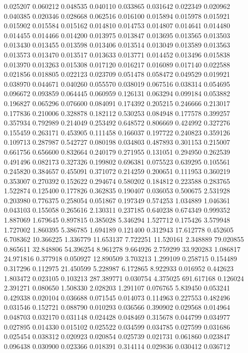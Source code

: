 0.025207
0.060212
0.048535
0.040110
0.033865
0.031642
0.022349
0.020962
0.040385
0.020346
0.028668
0.062516
0.016100
0.015894
0.015978
0.015921
0.015902
0.015584
0.015162
0.014810
0.014753
0.014807
0.014641
0.014480
0.014455
0.014466
0.014200
0.013975
0.013847
0.013695
0.013565
0.013503
0.013430
0.013455
0.013598
0.013406
0.013514
0.013049
0.013589
0.013563
0.013573
0.013470
0.013517
0.013633
0.013771
0.014452
0.013496
0.015838
0.013970
0.013263
0.015308
0.017120
0.016217
0.016089
0.017140
0.022588
0.021856
0.018805
0.022123
0.023709
0.051478
0.058472
0.049529
0.019921
0.038970
0.044671
0.040260
0.055570
0.038019
0.067516
0.038314
0.054695
0.096672
0.093859
0.064445
0.060959
0.126131
0.063294
0.099184
0.053882
0.196827
0.065296
0.076600
0.084091
0.174392
0.205215
0.246666
0.213017
0.177836
0.210006
0.328878
0.182112
0.530253
0.084948
0.177578
0.399257
0.357934
0.792989
0.214049
0.253492
0.648572
0.806669
0.424992
0.327276
0.155459
0.263171
0.453905
0.111458
0.166037
0.197722
0.240823
0.359126
0.109713
0.287987
0.542727
0.080198
0.034803
0.487893
0.301153
0.215007
0.661756
0.656600
0.832664
0.240179
0.271955
0.131051
0.294950
0.262539
0.491496
0.082173
0.327326
0.199802
0.696381
0.075523
0.639295
0.105561
0.245820
0.384657
0.455091
0.371072
0.214259
0.200651
0.111953
0.360219
0.353007
0.270392
0.152622
0.294674
0.580202
0.184812
0.223588
0.283765
1.522874
0.125400
0.177826
0.362835
0.190407
0.036053
0.500675
2.531928
0.203980
0.776375
0.258054
0.051867
0.197349
0.574253
1.034889
1.046361
0.043103
0.155058
0.265616
2.130311
0.237185
0.640238
0.674349
0.999352
1.887069
1.679645
0.897815
0.385028
5.346294
1.527712
0.175426
3.579948
1.727002
1.860395
5.386785
1.694189
0.121400
0.312943
17.612778
0.452605
6.708362
10.366225
1.336779
11.653137
7.722251
11.520161
2.348889
79.020855
0.865611
32.848806
54.396254
8.961278
9.664926
2.759299
33.920283
1.086817
24.971816
0.377918
0.050927
12.890509
3.703213
1.299109
0.258715
0.154489
0.317296
0.112975
21.450599
5.228987
6.172865
8.922933
0.016952
0.442623
1.803472
0.023105
0.103213
287.389771
0.030754
4.375025
691.617168
0.126024
2.391271
0.080650
1.508330
2.028203
1.291107
0.076765
5.839450
0.053241
0.429338
0.020104
0.036688
0.071545
0.014073
0.114963
0.227553
0.482496
0.031546
0.152721
0.088790
0.010293
0.036566
0.390902
0.029568
0.014964
0.048703
0.032170
0.031148
0.024428
0.048469
0.315678
0.044799
0.034977
0.027895
0.014330
0.015102
0.025522
0.034599
0.034785
0.027599
0.031686
0.025454
0.038312
0.020923
0.020854
0.025739
0.021731
0.061860
0.023847
0.096438
0.030900
0.023366
0.018391
0.314114
0.029836
0.030412
0.036712
